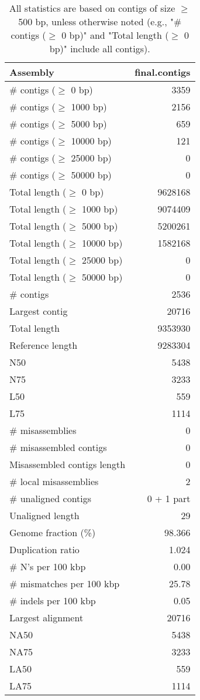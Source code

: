 \documentclass[12pt,a4paper]{article}
\begin{document}
\begin{table}[ht]
\begin{center}
\caption{All statistics are based on contigs of size $\geq$ 500 bp, unless otherwise noted (e.g., "\# contigs ($\geq$ 0 bp)" and "Total length ($\geq$ 0 bp)" include all contigs).}
\begin{tabular}{|l*{1}{|r}|}
\hline
Assembly & final.contigs \\ \hline
\# contigs ($\geq$ 0 bp) & 3359 \\ \hline
\# contigs ($\geq$ 1000 bp) & 2156 \\ \hline
\# contigs ($\geq$ 5000 bp) & 659 \\ \hline
\# contigs ($\geq$ 10000 bp) & 121 \\ \hline
\# contigs ($\geq$ 25000 bp) & 0 \\ \hline
\# contigs ($\geq$ 50000 bp) & 0 \\ \hline
Total length ($\geq$ 0 bp) & 9628168 \\ \hline
Total length ($\geq$ 1000 bp) & 9074409 \\ \hline
Total length ($\geq$ 5000 bp) & 5200261 \\ \hline
Total length ($\geq$ 10000 bp) & 1582168 \\ \hline
Total length ($\geq$ 25000 bp) & 0 \\ \hline
Total length ($\geq$ 50000 bp) & 0 \\ \hline
\# contigs & 2536 \\ \hline
Largest contig & 20716 \\ \hline
Total length & 9353930 \\ \hline
Reference length & 9283304 \\ \hline
N50 & 5438 \\ \hline
N75 & 3233 \\ \hline
L50 & 559 \\ \hline
L75 & 1114 \\ \hline
\# misassemblies & 0 \\ \hline
\# misassembled contigs & 0 \\ \hline
Misassembled contigs length & 0 \\ \hline
\# local misassemblies & 2 \\ \hline
\# unaligned contigs & 0 + 1 part \\ \hline
Unaligned length & 29 \\ \hline
Genome fraction (\%) & 98.366 \\ \hline
Duplication ratio & 1.024 \\ \hline
\# N's per 100 kbp & 0.00 \\ \hline
\# mismatches per 100 kbp & 25.78 \\ \hline
\# indels per 100 kbp & 0.05 \\ \hline
Largest alignment & 20716 \\ \hline
NA50 & 5438 \\ \hline
NA75 & 3233 \\ \hline
LA50 & 559 \\ \hline
LA75 & 1114 \\ \hline
\end{tabular}
\end{center}
\end{table}
\end{document}
